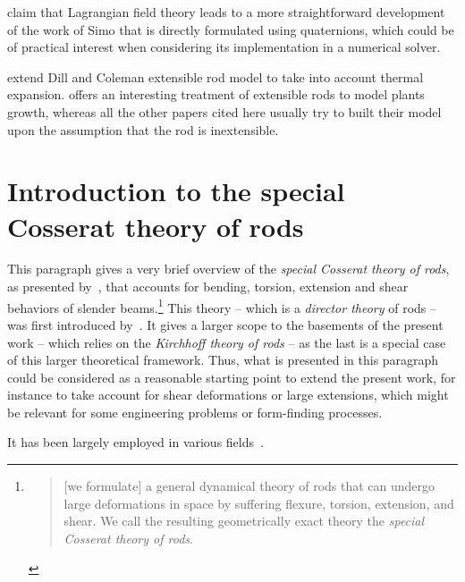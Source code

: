  claim that Lagrangian field theory leads to a more straightforward development of the work of Simo \cite{Simo1991} that is directly formulated using quaternions, which could be of practical interest when considering its implementation in a numerical solver.

 extend Dill and Coleman extensible rod model to take into account thermal expansion.  offers an interesting treatment of extensible rods to model plants growth, whereas all the other papers cited here usually try to built their model upon the assumption that the rod is inextensible.


\section{Introduction to the special Cosserat theory of rods}\label{sec:cosserat_theory}

This paragraph gives a very brief overview of the \emph{special Cosserat theory of rods}, as presented by~, that accounts for bending, torsion, extension and shear  behaviors of slender beams.\footnote{\blockcquote[p.~270]{Antman2005}{[we formulate] a general dynamical theory of rods that can undergo large deformations in space by suffering flexure, torsion, extension, and shear. We call the resulting geometrically exact theory the \emph{special Cosserat theory of rods}.}} This theory -- which is a \emph{director theory} of rods -- was first introduced by~\cite{Antman1974}. It gives a larger scope to the basements of the present work -- which relies on the \emph{Kirchhoff theory of rods} -- as the last is a special case of this larger theoretical framework. Thus, what is presented in this paragraph could be considered as a reasonable starting point to extend the present work, for instance to take account for shear deformations or large extensions, which might be relevant for some engineering problems or form-finding processes.

It has been largely employed in various fields~\cite{Shi1995, Bergou2010}.

